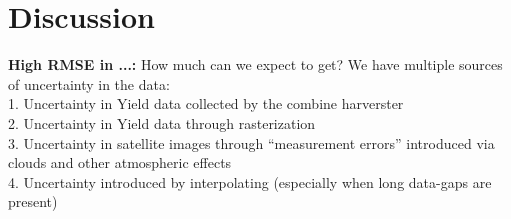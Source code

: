 \chapter{Discussion}


\textbf{High RMSE in ...:} How much can we expect to get? We have multiple sources of uncertainty in the data:
\\1. Uncertainty in Yield data collected by the combine harverster
\\2. Uncertainty in Yield data through rasterization
\\3. Uncertainty in satellite images through ``measurement errors'' introduced via clouds and other atmospheric effects 
\\4. Uncertainty introduced by interpolating (especially when long data-gaps are present)




